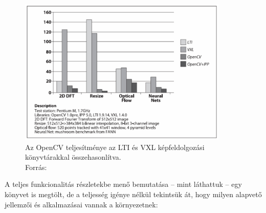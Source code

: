 \begin{figure}[!ht]
\centering
\includegraphics[width=100mm, keepaspectratio]{figures/opencv_speed.png}
\caption{Az OpenCV teljesítménye az LTI és VXL képfeldolgozási könyvtárakkal összehasonlítva.\\Forrás: \cite{opencv_book}}
\label{fig:opencv_speed}
\end{figure}

A teljes funkcionalitás részletekbe menő bemutatása -- mint láthattuk \cite{opencv_book} -- egy könyvet is megtölt, de a teljesség igénye nélkül tekintsük át, hogy milyen alapvető jellemzői és alkalmazásai vannak a környezetnek:

